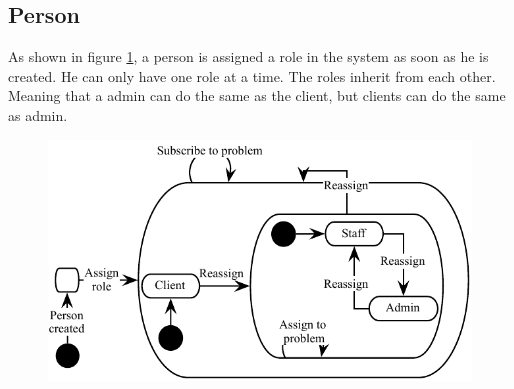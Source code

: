 \subsection{Person}
As shown in figure \ref{fig:Klasse_diagram_person}, a person is assigned a role in the system as soon as he is created. He can only have one role at a time. The roles inherit from each other. Meaning that a admin can do the same as the client, but clients can do the same as admin. 
\begin{figure}[H]
\begin{center}
\includegraphics[scale=1]{input/problem_domain_analysis/Klassediagram_person.pdf}
\label{fig:Klasse_diagram_person}
\end{center}
\end{figure}

